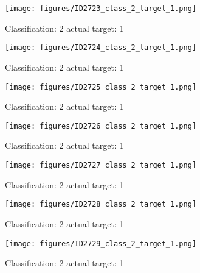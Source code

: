 \begin{figure}[h!]
\begin{center}
\texttt{[image: figures/ID2723\_class\_2\_target\_1.png]}
\end{center}
\caption{ Classification: 2 actual target: 1}
\label{fig:ID2723_class_2_target_1}
\end{figure}
\begin{figure}[h!]
\begin{center}
\texttt{[image: figures/ID2724\_class\_2\_target\_1.png]}
\end{center}
\caption{ Classification: 2 actual target: 1}
\label{fig:ID2724_class_2_target_1}
\end{figure}
\begin{figure}[h!]
\begin{center}
\texttt{[image: figures/ID2725\_class\_2\_target\_1.png]}
\end{center}
\caption{ Classification: 2 actual target: 1}
\label{fig:ID2725_class_2_target_1}
\end{figure}
\begin{figure}[h!]
\begin{center}
\texttt{[image: figures/ID2726\_class\_2\_target\_1.png]}
\end{center}
\caption{ Classification: 2 actual target: 1}
\label{fig:ID2726_class_2_target_1}
\end{figure}
\begin{figure}[h!]
\begin{center}
\texttt{[image: figures/ID2727\_class\_2\_target\_1.png]}
\end{center}
\caption{ Classification: 2 actual target: 1}
\label{fig:ID2727_class_2_target_1}
\end{figure}
\begin{figure}[h!]
\begin{center}
\texttt{[image: figures/ID2728\_class\_2\_target\_1.png]}
\end{center}
\caption{ Classification: 2 actual target: 1}
\label{fig:ID2728_class_2_target_1}
\end{figure}
\begin{figure}[h!]
\begin{center}
\texttt{[image: figures/ID2729\_class\_2\_target\_1.png]}
\end{center}
\caption{ Classification: 2 actual target: 1}
\label{fig:ID2729_class_2_target_1}
\end{figure}

